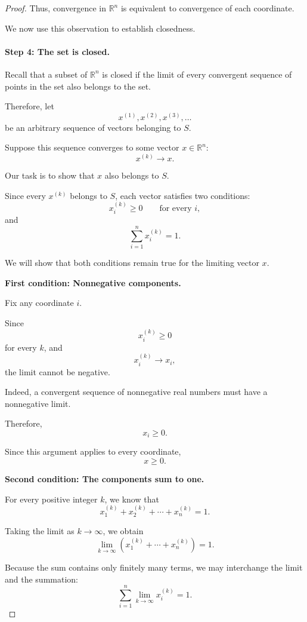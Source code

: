 \documentclass[11pt,a4paper]{article}
\theoremstyle{definition}
\theoremstyle{remark}
\begin{document}
\begin{proof}
Thus, convergence in $\mathbb{R}^n$
is equivalent to convergence
of each coordinate.

We now use this observation
to establish closedness.


\paragraph{Step 4: The set is closed.}

Recall that a subset of
$\mathbb{R}^n$ is closed if
the limit of every convergent
sequence of points in the set
also belongs to the set.

Therefore, let
\[
x^{(1)},x^{(2)},x^{(3)},\ldots
\]
be an arbitrary sequence
of vectors belonging to $S$.

Suppose this sequence converges
to some vector $x\in\mathbb{R}^n$:
\[
x^{(k)}\longrightarrow x.
\]

Our task is to show that
$x$ also belongs to $S$.

Since every $x^{(k)}$ belongs
to $S$, each vector satisfies
two conditions:
\[
x_i^{(k)}\geq0
\qquad
\text{for every }i,
\]
and
\[
\sum_{i=1}^{n}x_i^{(k)}=1.
\]

We will show that both
conditions remain true
for the limiting vector $x$.

\medskip

\textbf{First condition: Nonnegative components.}

Fix any coordinate $i$.

Since
\[
x_i^{(k)}\geq0
\]
for every $k$, and
\[
x_i^{(k)}\longrightarrow x_i,
\]
the limit cannot be negative.

Indeed, a convergent sequence
of nonnegative real numbers
must have a nonnegative limit.

Therefore,
\[
x_i\geq0.
\]

Since this argument applies
to every coordinate,
\[
\boxed{x\geq0.}
\]

\medskip

\textbf{Second condition: The components
sum to one.}

For every positive integer $k$,
we know that
\[
x_1^{(k)}
+x_2^{(k)}
+\cdots
+x_n^{(k)}
=1.
\]

Taking the limit as $k\to\infty$,
we obtain
\[
\lim_{k\to\infty}
\left(
x_1^{(k)}
+\cdots
+x_n^{(k)}
\right)
=1.
\]

Because the sum contains
only finitely many terms,
we may interchange the
limit and the summation:
\[
\sum_{i=1}^{n}
\lim_{k\to\infty}x_i^{(k)}
=1.
\]


\end{proof}
\end{document}

